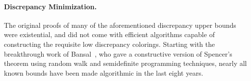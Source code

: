 \documentclass[11pt]{article}
\begin{document}
\paragraph{\bf Discrepancy Minimization.} The original proofs of many of the
aforementioned discrepancy upper bounds were existential, and did not come with
efficient algorithms capable of constructing the requisite low discrepancy
colorings. %
Starting with the breakthrough work of Bansal~\cite{Bansal10}, who gave a constructive version of Spencer's theorem using random walk and semidefinite programming techniques, nearly all known bounds have been made algorithmic in the last eight years.
\end{document}
